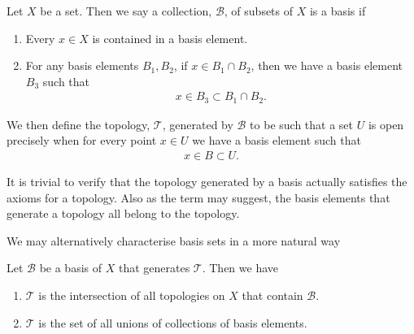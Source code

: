 \documentclass[]{article}
\begin{document}
\begin{defi} [Basis]
	Let $X$ be a set. Then we say a collection, $\mathcal{B}$, of subsets of $X$ is a basis if
	\begin{enumerate}
			\item Every $x \in X$ is contained in a basis element.
			\item For any basis elements $B_1, B_2$, if $x \in B_1 \cap B_2$, then we have a basis element $B_3$ such that
					\begin{align*}
							x \in B_3 \subset B_1 \cap B_2.
					\end{align*}
	\end{enumerate}

	We then define the topology, $\mathcal{T}$, generated by $\mathcal{B}$ to be such that a set $U$ is open precisely when for every point $x \in U$ we have a basis element such that
	\begin{align*}
			x \in B \subset U.
	\end{align*}
\end{defi}

It is trivial to verify that the topology generated by a basis actually satisfies the axioms for a topology. Also as the term may suggest, the basis elements that generate a topology all belong to the topology. 

We may alternatively characterise basis sets in a more natural way

\begin{thm}
	Let $\mathcal{B}$ be a basis of $X$ that generates $\mathcal{T}$. Then we have
	\begin{enumerate}
			\item $\mathcal{T}$ is the intersection of all topologies on $X$ that contain $\mathcal{B}$.
			\item $\mathcal{T}$ is the set of all unions of collections of basis elements.
	\end{enumerate}
\end{thm}
\end{document}
